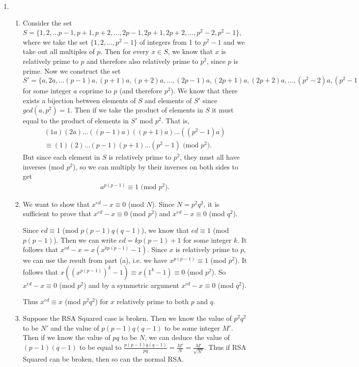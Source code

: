 \begin{enumerate}
    \item \begin{enumerate}
        \setlength{\parskip}{8pt}
        \item Consider the set $S=\{1, 2,\ldots p-1, p+1, p+2,\ldots, 2p-1, 2p+1, 2p+2,\ldots, p^2-2, p^2-1\}$, where we take the set $\{1, 2,\ldots, p^2-1\}$ of integers from 1 to $p^2-1$ and we take out all multiples of $p$. Then for every $x\in S$, we know that $x$ is relatively prime to $p$ and therefore also relatively prime to $p^2$, since $p$ is prime. Now we construct the set $S'=\{a, 2a,\ldots (p-1)a, (p+1)a, (p+2)a,\ldots, (2p-1)a, (2p+1)a, (2p+2)a,\ldots, (p^2-2)a, (p^2-1)a\}$ for some integer $a$ coprime to $p$ (and therefore $p^2$). We know that there exists a bijection between elements of $S$ and elements of $S'$ since $gcd(a,p^2)=1$. Then if we take the product of elements in $S$ it must equal to the product of elements in $S'$ mod $p^2$. That is,
        \begin{align*}
            (1a)(2a)\ldots((p-1)a)((p+1)a)\ldots((p^2-1)a) \\
            \equiv (1)(2)\ldots(p-1)(p+1)\ldots(p^2-1) \text{ (mod }p^2).
        \end{align*}
        But since each element in $S$ is relatively prime to $p^2$, they must all have inverses (mod $p^2$), so we can multiply by their inverses on both sides to get
        \begin{align*}
            a^{p(p-1)} \equiv 1 \text{ (mod }p^2).
        \end{align*}
        
        \item We want to show that $x^{ed}-x\equiv 0$ (mod $N$). Since $N=p^2q^2$, it is sufficient to prove that $x^{ed}-x\equiv 0$ (mod $p^2$) and $x^{ed}-x\equiv 0$ (mod $q^2$).
        
        Since $ed\equiv 1$ (mod $p(p-1)q(q-1)$), we know that $ed\equiv 1$ (mod $p(p-1)$). Then we can write $ed=kp(p-1)+1$ for some integer $k$. It follows that $x^{ed}-x=x(x^{kp(p-1)}-1)$. Since $x$ is relatively prime to $p$, we can use the result from part (a), i.e. we have $x^{p(p-1)}\equiv 1$ (mod $p^2$). It follows that $x((x^{p(p-1)})^k-1)\equiv x(1^k-1)\equiv 0$ (mod $p^2$). So $x^{ed}-x\equiv 0$ (mod $p^2$) and by a symmetric argument $x^{ed}-x\equiv 0$ (mod $q^2$).
        
        Thus $x^{ed}\equiv x$ (mod $p^2q^2$) for $x$ relatively prime to both $p$ and $q$.
        
        \item Suppose the RSA Squared case is broken. Then we know the value of $p^2q^2$ to be $N'$ and the value of $p(p-1)q(q-1)$ to be some integer $M'$. Then if we know the value of $pq$ to be $N$, we can deduce the value of $(p-1)(q-1)$ to be equal to $\frac{p(p-1)q(q-1)}{pq} = \frac{M'}{N} = \frac{M'}{\sqrt{N'}}$. Thus if RSA Squared can be broken, then so can the normal RSA.
    \end{enumerate}
\end{enumerate}